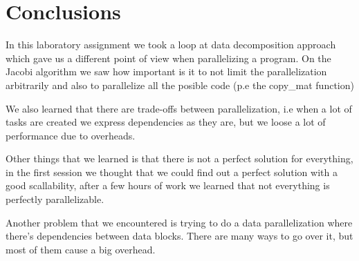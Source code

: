 \section{Conclusions}

\justify
In this laboratory assignment we took a loop at data decomposition approach which gave us a different point of view when parallelizing a program.
\justify
On the Jacobi algorithm we saw how important is it to not limit the parallelization arbitrarily and also to parallelize all the posible code (p.e the copy\_mat function)

\justify
We also learned that there are trade-offs between parallelization, i.e when a lot of tasks are created we express dependencies as they are, but we loose a lot of performance due to overheads.

\justify
Other things that we learned is that there is not a perfect solution for everything, in the first session we thought that we could find out a perfect solution with a good scallability, after a few hours of work we learned that not everything is perfectly parallelizable. 

\justify
Another problem that we encountered is trying to do a data parallelization where there's dependencies between data blocks. There are many ways to go over it,  but most of them cause a big overhead.